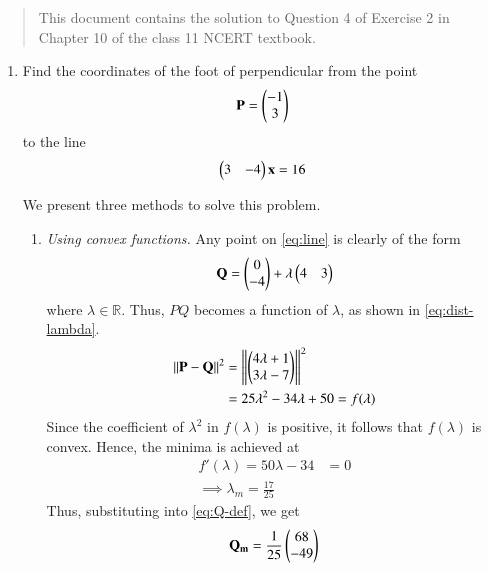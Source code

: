 \documentclass[journal,12pt,twocolumn]{IEEEtran}
\begin{document}
\begin{abstract}
    This document contains the solution to Question 4 of Exercise 2 in Chapter
    10 of the class 11 NCERT textbook.
\end{abstract}

\begin{enumerate}
    \item Find the coordinates of the foot of perpendicular from the point 
    \begin{align}
        \mathbf{P} = \begin{pmatrix}-1\\3\end{pmatrix}
        \label{eq:P-def}
    \end{align}
    to the line 
    \begin{align}
        \begin{pmatrix}3&-4\end{pmatrix}\mathbf{x} = 16
        \label{eq:line}
    \end{align}

    \solution We present three methods to solve this problem.
    \begin{enumerate}
        \item \textit{Using convex functions.} Any point on \eqref{eq:line}
        is clearly of the form
        \begin{align}
            \mathbf{Q} = \begin{pmatrix}0\\-4\end{pmatrix} + \lambda\begin{pmatrix}4&3\end{pmatrix}
            \label{eq:Q-def}
        \end{align}
        where $\lambda \in \mathbb{R}$. Thus, $PQ$ becomes a function of $\lambda$,
        as shown in \eqref{eq:dist-lambda}.
        \begin{align}
            \left\lVert\mathbf{P}-\mathbf{Q}\right\rVert^2 &= \left\lVert\begin{pmatrix}4\lambda+1\\3\lambda-7\end{pmatrix}\right\rVert^2 \\
                                     &= 25\lambda^2-34\lambda+50 = f(\lambda)
                                     \label{eq:dist-lambda}
        \end{align}
        Since the coefficient of $\lambda^2$ in $f(\lambda)$ is positive, it
        follows that $f(\lambda)$ is convex. Hence, the minima is achieved at
        \begin{align}
            f'(\lambda) = 50\lambda - 34 &= 0 \\
            \implies \lambda_m = \frac{17}{25}
            \label{eq:lambda-min}
        \end{align}
        Thus, substituting into \eqref{eq:Q-def}, we get
        \begin{align}
            \mathbf{Q_m} = \frac{1}{25}\begin{pmatrix}68\\-49\end{pmatrix}
            \label{eq:Q-sol}
        \end{align}


\end{enumerate}
\end{enumerate}
\end{document}
